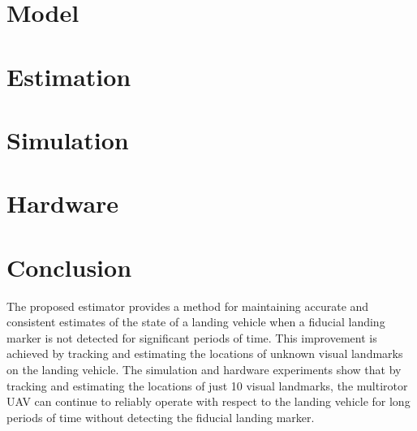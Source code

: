 \documentclass[journal,onecolumn]{IEEEtran}
\begin{document}
\section{Model} \label{sec:model}



% 
% 

\section{Estimation} \label{sec:estimation}




% 


\section{Simulation} \label{sec:simulation}


\section{Hardware} \label{sec:hardware}

% 






\section{Conclusion} \label{sec:conclusion}
The proposed estimator provides a method for maintaining accurate and consistent
estimates of the state of a landing vehicle when a fiducial landing marker is
not detected for significant periods of time. This improvement is achieved by
tracking and estimating the locations of unknown visual landmarks on the landing
vehicle. The simulation and hardware experiments show that by tracking and
estimating the locations of just 10 visual landmarks, the multirotor UAV can
continue to reliably operate with respect to the landing vehicle for long
periods of time without detecting the fiducial landing marker.






\end{document}
